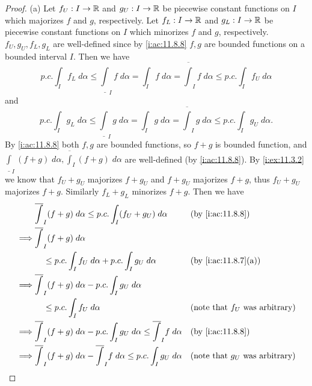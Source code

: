 \begin{proof}{(a)}
  Let \(f_U : I \to \mathbb{R}\) and \(g_U : I \to \mathbb{R}\) be piecewise constant functions on \(I\) which majorizes \(f\) and \(g\), respectively.
  Let \(f_L : I \to \mathbb{R}\) and \(g_L : I \to \mathbb{R}\) be piecewise constant functions on \(I\) which minorizes \(f\) and \(g\), respectively.
  \(f_U, g_U, f_L, g_L\) are well-defined since by \cref{i:ac:11.8.8} \(f, g\) are bounded functions on a bounded interval \(I\).
  Then we have
  \[
    p.c. \int_I f_L \; d \alpha \leq \underline{\int}_I f \; d \alpha = \int_I f \; d \alpha = \overline{\int}_I f \; d \alpha \leq p.c. \int_I f_U \; d \alpha
  \]
  and
  \[
    p.c. \int_I g_L \; d \alpha \leq \underline{\int}_I g \; d \alpha = \int_I g \; d \alpha = \overline{\int}_I g \; d \alpha \leq p.c. \int_I g_U \; d \alpha.
  \]
  By \cref{i:ac:11.8.8} both \(f, g\) are bounded functions, so \(f + g\) is bounded function, and \(\underline{\int}_I (f + g) \; d \alpha, \overline{\int}_I (f + g) \; d \alpha\) are well-defined (by \cref{i:ac:11.8.8}).
  By \cref{i:ex:11.3.2} we know that \(f_U + g_U\) majorizes \(f + g_U\) and \(f + g_U\) majorizes \(f + g\), thus \(f_U + g_U\) majorizes \(f + g\).
  Similarly \(f_L + g_L\) minorizes \(f + g\).
  Then we have
  \begin{align*}
             & \overline{\int}_I (f + g) \; d \alpha \leq p.c. \int_I (f_U + g_U) \; d \alpha                               &   & \by{i:ac:11.8.8}                         \\
    \implies & \overline{\int}_I (f + g) \; d \alpha                                                                                                                       \\
             & \quad \leq p.c. \int_I f_U \; d \alpha + p.c. \int_I g_U \; d \alpha                                         &   & \by{i:ac:11.8.7}[a]                      \\
    \implies & \overline{\int}_I (f + g) \; d \alpha - p.c. \int_I g_U \; d \alpha                                                                                         \\
             & \quad \leq p.c. \int_I f_U \; d \alpha                                                                       &   & \text{(note that \(f_U\) was arbitrary)} \\
    \implies & \overline{\int}_I (f + g) \; d \alpha - p.c. \int_I g_U \; d \alpha \leq \overline{\int}_I f \; d \alpha     &   & \by{i:ac:11.8.8}                         \\
    \implies & \overline{\int}_I (f + g) \; d \alpha - \overline{\int}_I f \; d \alpha \leq p.c. \int_I g_U \; d \alpha     &   & \text{(note that \(g_U\) was arbitrary)} \\

\end{align*}
\end{proof}
